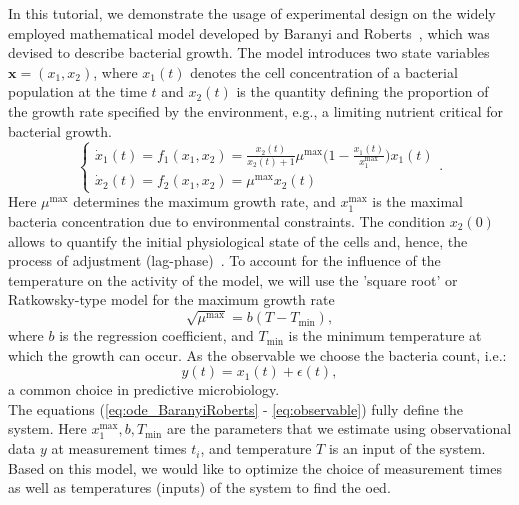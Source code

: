 \documentclass[graybox]{svmult}
\newcommand{\mbx}{\mathbf{x}}
\begin{document}
In this tutorial, we demonstrate the usage of experimental design on the widely employed mathematical model developed by Baranyi and Roberts~\cite{baranyiDynamicApproach1994}, which was devised to describe bacterial growth.
The model introduces two state variables $\mbx = (x_1, x_2)$, where $x_1(t)$ denotes the cell concentration of a bacterial population at the time $t$
and $x_2(t)$ is the quantity defining the proportion of the growth rate specified by the environment, e.g., a limiting nutrient critical for bacterial growth.
\begin{equation}
    \begin{cases}
        \dot x_1(t) = f_1(x_1, x_2) = \frac{x_2(t)}{x_2(t) + 1} \mu^\text{max} \big(1 - \frac{x_1(t)}{x_1^\text{max}}\big) x_1(t)\\
        \dot x_2(t) = f_2(x_1, x_2) = \mu^\text{max}  x_2(t)
    \end{cases}.
    \label{eq:ode_BaranyiRoberts}
\end{equation}
Here $\mu^\text{max}$ determines the maximum growth rate, and $x_1^\text{max}$ is the maximal bacteria concentration due to environmental constraints.
The condition $x_2(0)$ allows to quantify the initial physiological state of the cells and, hence, the process of adjustment (lag-phase)~\cite{grijspeerdt_estimating_1999}.
To account for the influence of the temperature on the activity of the model, we will use the 'square root' or Ratkowsky-type model for the maximum growth rate~\cite{ratkowsky_relationship_1982}
\begin{equation}
    \sqrt{\mu^\text{max}} = b (T - T_\text{min}),
    \label{eq:RatkowskyModel}
\end{equation}
where $b$ is the regression coefficient, and $T_\text{min}$ is the minimum temperature at which the growth can occur.
As the observable we choose the bacteria count, i.e.:
\begin{equation}
    y(t) = x_1(t)+\epsilon(t),
    \label{eq:observable}
 \end{equation}
a common choice in predictive microbiology.\\
The equations (\ref{eq:ode_BaranyiRoberts} - \ref{eq:observable}) fully define the system.
Here $x_1^\text{max}, b, T_\text{min}$ are the parameters that we estimate using observational data $y$ at measurement times $t_i$, and temperature $T$ is an input of the system.
Based on this model, we would like to optimize the choice of measurement times as well as temperatures (inputs) of the system to find the \acl{oed}.
%
\end{document}
